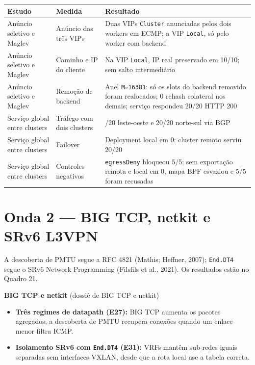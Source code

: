 \documentclass[12pt,openany,oneside,a4paper,chapter=TITLE,english,brazil]{abntex2}
\providecommand{\tightlist}{\setlength{\itemsep}{0pt}\setlength{\parskip}{0pt}}
\begin{document}
\begin{quadro}[!htbp]
\caption{Resultados de LoadBalancer e Cluster Mesh}
\footnotesize
\begin{tabularx}{\textwidth}{|>{\raggedright\arraybackslash\hsize=0.757\hsize}X|>{\raggedright\arraybackslash\hsize=0.703\hsize}X|>{\raggedright\arraybackslash\hsize=1.540\hsize}X|}
\hline
\textbf{Estudo} & \textbf{Medida} & \textbf{Resultado} \\
\hline
Anúncio seletivo e Maglev & Anúncio das três VIPs & Duas VIPs \texttt{Cluster} anunciadas pelos dois workers em ECMP; a VIP
\texttt{Local}, só pelo worker com backend \\
\hline
Anúncio seletivo e Maglev & Caminho e IP do cliente & Na VIP \texttt{Local}, IP real preservado em 10/10; sem salto
intermediário \\
\hline
Anúncio seletivo e Maglev & Remoção de backend & Anel \texttt{M=\allowbreak{}16381}: só os slots do backend removido
foram realocados; 0 rehash colateral nos demais; serviço respondeu 20/20
HTTP 200 \\
\hline
Serviço global entre clusters & Tráfego com dois clusters & 20/20 leste-oeste e 20/20 norte-sul via BGP \\
\hline
Serviço global entre clusters & Failover & Deployment local em 0: cluster remoto serviu 20/20 \\
\hline
Serviço global entre clusters & Controles negativos & \texttt{egress\allowbreak{}Deny} bloqueou 5/5; sem exportação remota e
local em 0, mapa BPF esvaziou e 5/5 foram recusadas \\
\hline
\end{tabularx}
\end{quadro}

\section{Onda 2 --- BIG TCP, netkit e SRv6 L3VPN}\label{onda-2-big-tcp-netkit-e-srv6-l3vpn}

A descoberta de PMTU segue a RFC 4821 (Mathis; Heffner, 2007); \texttt{End.\allowbreak{}DT4} segue o SRv6 Network Programming (Filsfils et al., 2021). Os resultados estão no Quadro 21.

\textbf{BIG TCP e netkit} (dossiê de BIG TCP e netkit)

\begin{itemize}
\tightlist
\item
  \textbf{Três regimes de datapath (E27):} BIG TCP aumenta os pacotes agregados; a descoberta de PMTU recupera conexões quando um enlace menor filtra ICMP.
\item
  \textbf{Isolamento SRv6 com \texttt{End.\allowbreak{}DT4} (E31):} VRFs mantêm sub-redes iguais separadas sem interfaces VXLAN, desde que a rota local use a tabela correta.
\end{itemize}
\end{document}
